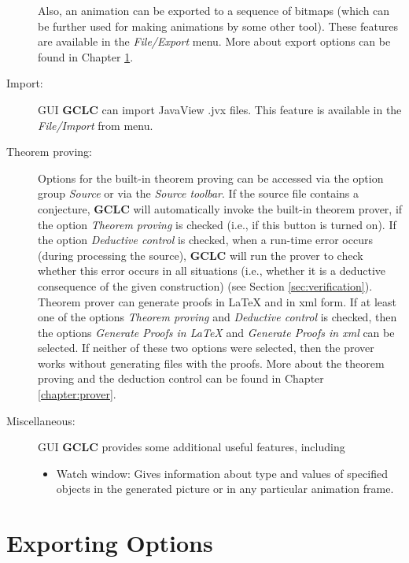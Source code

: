 \documentclass[a4paper]{book}
\newcommand{\gclc}{{\bfseries GCLC}\xspace}
\begin{document}
\begin{description}
    Also, an animation can be exported to a sequence of bitmaps
    (which can be further used for making animations by some other
    tool). These features are available in the {\it File/Export} menu.
    More about export options can be found in Chapter \ref{chapter:export}.

\item[Import:] GUI \gclc can import JavaView .jvx files. This feature is
available in the {\it File/Import} from menu.

\item[Theorem proving:] Options for the built-in theorem proving can
be accessed via the option group {\it Source} or via the {\it Source
toolbar}. If the source file contains a conjecture, \gclc will
automatically invoke the built-in theorem prover, if the option
{\it Theorem proving} is checked (i.e., if this button is turned on).
If the option {\it Deductive control} is checked, when a run-time
error occurs (during processing the source), \gclc will run the
prover to check whether this error occurs in all situations (i.e.,
whether it is a deductive consequence of the given construction)
(see Section \ref{sec:verification}).
Theorem prover can generate proofs in \LaTeX{} and in {\sc xml} form.
If at least one of the options {\it Theorem proving} and
{\it Deductive control} is checked, then the options {\it Generate Proofs
in \LaTeX{}} and {\it Generate Proofs in {\sc xml}} can be selected.
If neither of these two options were selected, then the prover works
without generating files with the proofs.
More about the theorem proving and the deduction control can be
found in Chapter \ref{chapter:prover}.


\item[Miscellaneous:] GUI \gclc provides some additional useful
features, including 

\begin{itemize}
    \item Watch window: Gives information about type and values of
    specified objects in the generated picture or in any particular
    animation frame.
\end{itemize}

\end{description}


\chapter{Exporting Options}
\label{chapter:export}
\end{document}
